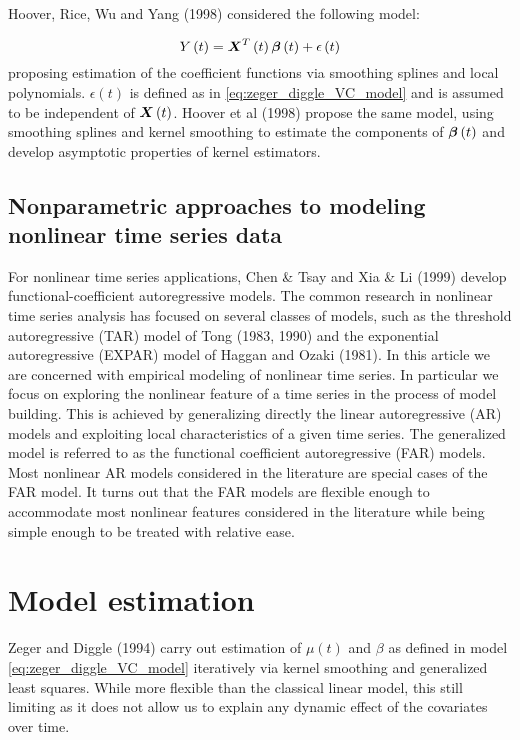 \documentclass[12pt]{article}
\newcommand*\needsparaphrased{\color{red}}
\newcommand{\bfbeta}{\mbox{\boldmath $\beta$}}
\newcommand{\bfX}{\mbox{\boldmath $X$}}
\begin{document}
Hoover, Rice, Wu and Yang (1998) considered the following model:

\begin{equation} \label{eq:hoover_rice_wu_VC_model}
Y\left(t\right) =  \bfX^T\left(t\right)\bfbeta \left(t\right) + \epsilon\left(t\right) 
\end{equation}
\noindent
proposing estimation of the coefficient functions via smoothing splines and local polynomials. $\epsilon\left(t\right)$ is defined as in \ref{eq:zeger_diggle_VC_model} and is assumed to be independent of $\bfX\left(t\right)$. Hoover et al (1998) propose the same model, using smoothing splines and kernel smoothing to estimate  the components of $\bfbeta\left(t\right)$ and develop asymptotic properties of kernel estimators. 


\subsection{Nonparametric approaches to modeling nonlinear time series data}


For nonlinear time series applications, Chen \& Tsay \cite{chen1993functional} and Xia \& Li (1999) develop functional-coefficient autoregressive models. The common research in nonlinear time series analysis has focused on several classes of models, such as the threshold autoregressive (TAR) model of Tong (1983, 1990) and the exponential autoregressive (EXPAR) model of Haggan and Ozaki (1981). {\needsparaphrased In this article we are concerned with empirical modeling of nonlinear time series. In particular we focus on exploring the nonlinear feature of a time series in the process of model building. This is achieved by generalizing directly the linear autoregressive (AR) models and exploiting local characteristics of a given time series. The generalized model is referred to as the functional coefficient autoregressive (FAR) models. Most nonlinear AR models considered in the literature are special cases of the FAR model. It turns out that the FAR models are flexible enough to accommodate most nonlinear features considered in the literature while being simple enough to be treated with relative ease. }


\section{Model estimation}

Zeger and Diggle (1994) carry out estimation of $\mu\left(t\right)$ and $\beta$ as defined in model \ref{eq:zeger_diggle_VC_model} iteratively via kernel smoothing and generalized least squares. While more flexible than the classical linear model, this still limiting as it does not allow us to explain any dynamic effect of the covariates over time.  
\end{document}
